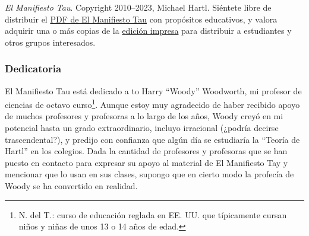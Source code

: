     \emph{El Manifiesto Tau}. Copyright 2010--2023, Michael Hartl. Siéntete libre de distribuir el \href{https://tauday.com/tau_manifesto.pdf}{PDF de El Manifiesto Tau} con propósitos educativos, y valora adquirir una o más copias de la \href{https://tauday.com/print}{edición impresa} para distribuir a estudiantes y otros grupos interesados.



\renewcommand{\thesubsubsection}{6.283185}

    \subsubsection{Dedicatoria} %
    \label{sec:dedication}

    El Manifiesto Tau está dedicado a to Harry ``Woody'' Woodworth, mi profesor de ciencias de octavo curso\footnote{N. del T.: curso de educación reglada en EE. UU. que típicamente cursan niños y niñas de unos 13 o 14 años de edad.}. Aunque estoy muy agradecido de haber recibido apoyo de muchos profesores y profesoras a lo largo de los años, Woody creyó en mi potencial hasta un grado extraordinario, incluyo irracional (¿podría decirse trascendental?), y predijo con confianza que algún día se estudiaría la ``Teoría de Hartl'' en los colegios. Dada la cantidad de profesores y profesoras que se han puesto en contacto para expresar su apoyo al material de El Manifiesto Tay y mencionar que lo usan en sus clases, supongo que en cierto modo la profecía de Woody se ha convertido en realidad.

